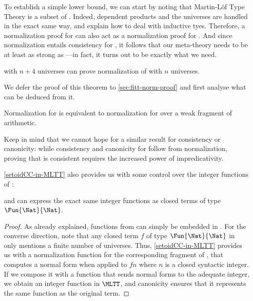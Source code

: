 To establish a simple lower bound, we can start by noting that Martin-Löf
Type Theory is a subset of \SetoidCC. Indeed, dependent products and
the universes are handled in the exact same way, and  explain
how to deal with inductive tyes.
%
Therefore, a normalization proof for \SetoidCC can also act as a
normalization proof for \MLTT.
%
And since normalization entails consistency for \MLTT, it follows that our
meta-theory needs to be at least as strong as \MLTT---in fact, it turns out to be exactly what we need.

\begin{theorem}\label{setoidCC-in-MLTT}
  \MLTT with \( n + 4 \) universes can prove normalization of \SetoidCC with
  \( n \) universes.
\end{theorem}

We defer the proof of this theorem to \cref{sec:fitt-norm-proof} and
first analyse what can be deduced from it.

\begin{corollary}
  Normalization for \SetoidCC is equivalent to normalization for \MLTT
  over a weak fragment of arithmetic.
\end{corollary}

Keep in mind that we cannot hope for a similar result for consistency or
canonicity: while consistency and canonicity for \MLTT follow from
normalization, proving that \SetoidCC is consistent requires the increased
power of impredicativity.

\cref{setoidCC-in-MLTT} also provides us with some
control over the integer functions of \SetoidCC:

\begin{corollary}\label{integer-functions}
  \SetoidCC and \MLTT can express the exact same integer functions
  as closed terms of type \( \Fun{\Nat}{\Nat} \).
\end{corollary}

\begin{proof}
  As already explained, functions from \MLTT can simply be embedded in
  \SetoidCC.
  For the converse direction, note that any closed term \( f \) of
  type \( \Fun{\Nat}{\Nat} \) in \SetoidCC only mentions a finite number of
  universes.
%
  Thus, \cref{setoidCC-in-MLTT} provides us with a
  normalization function for the corresponding fragment of \SetoidCC,
  that computes a normal form when applied to \( f n \) where \( n \)
  is a closed syntactic integer.
%
  If we compose it with a function that sends normal forms to the
  adequate integer, %
  we obtain an integer function in \( \MLTT \), and canonicity ensures
  that it represents the same function as the original \SetoidCC term.
\end{proof}

